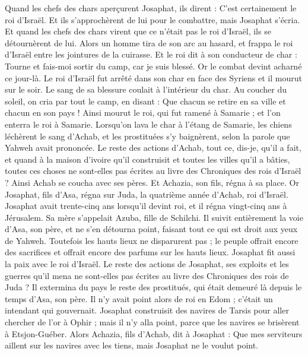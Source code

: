 \begin{multicols}{2}
Quand les chefs des chars aperçurent Josaphat, ils dirent : C'est certainement le roi d'Israël. Et ils s'approchèrent de lui pour le combattre, mais Josaphat s'écria.
Et quand les chefs des chars virent que ce n'était pas le roi d'Israël, ils se détournèrent de lui.
Alors un homme tira de son arc au hasard, et frappa le roi d'Israël entre les jointures de la cuirasse. Et le roi dit à son conducteur de char : Tourne et fais-moi sortir du camp, car je suis blessé.
Or le combat devint acharné ce jour-là. Le roi d'Israël fut arrêté dans son char en face des Syriens et il mourut sur le soir. Le sang de sa blessure coulait à l'intérieur du char.
Au coucher du soleil, on cria par tout le camp, en disant : Que chacun se retire en sa ville et chacun en son pays !
Ainsi mourut le roi, qui fut ramené à Samarie ; et l'on enterra le roi à Samarie.
Lorsqu'on lava le char à l'étang de Samarie, les chiens léchèrent le sang d'Achab, et les prostituées s'y baignèrent, selon la parole que Yahweh avait prononcée.
Le reste des actions d'Achab, tout ce, dis-je, qu'il a fait, et quand à la maison d'ivoire qu'il construisit et toutes les villes qu'il a bâties, toutes ces choses ne sont-elles pas écrites au livre des Chroniques des rois d'Israël ?
Ainsi Achab se coucha avec ses pères. Et Achazia, son fils, régna à sa place.
Or Josaphat, fils d'Asa, régna sur Juda, la quatrième année d'Achab, roi d'Israël.
Josaphat avait trente-cinq ans lorsqu'il devint roi, et il régna vingt-cinq ans à Jérusalem. Sa mère s'appelait Azuba, fille de Schilchi.
Il suivit entièrement la voie d'Asa, son père, et ne s'en détourna point, faisant tout ce qui est droit aux yeux de Yahweh.
Toutefois les hauts lieux ne disparurent pas ; le peuple offrait encore des sacrifices et offrait encore des parfums sur les hauts lieux.
Josaphat fit aussi la paix avec le roi d'Israël.
Le reste des actions de Josaphat, ses exploits et les guerres qu'il mena ne sont-elles pas écrites au livre des Chroniques des rois de Juda ?
Il extermina du pays le reste des prostitués, qui était demeuré là depuis le temps d'Asa, son père.
Il n'y avait point alors de roi en Edom ; c'était un intendant qui gouvernait.
Josaphat construisit des navires de Tarsis pour aller chercher de l'or à Ophir ; mais il n'y alla point, parce que les navires se brisèrent à Etsjon-Guéber.
Alors Achazia, fils d'Achab, dit à Josaphat : Que mes serviteurs aillent sur les navires avec les tiens, mais Josaphat ne le voulut point.

\end{multicols}
